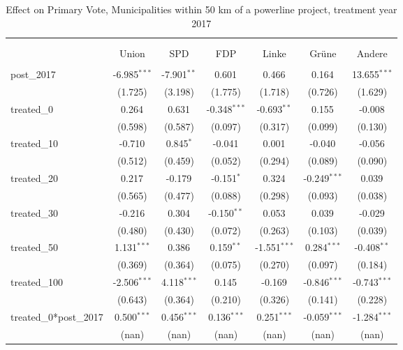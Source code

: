 \begin{table}[!htbp] \centering
  \caption{Effect on Primary Vote, Municipalities within 50 km of a powerline project, treatment year 2017}
\begin{tabular}{@{\extracolsep{5pt}}lcccccc}
\\[-1.8ex]\hline
\hline \\[-1.8ex]
\\[-1.8ex] & \multicolumn{1}{c}{Union} & \multicolumn{1}{c}{SPD} & \multicolumn{1}{c}{FDP} & \multicolumn{1}{c}{Linke} & \multicolumn{1}{c}{Grüne} & \multicolumn{1}{c}{Andere}  \\
\hline \\[-1.8ex]
 post_2017 & -6.985$^{***}$ & -7.901$^{**}$ & 0.601$^{}$ & 0.466$^{}$ & 0.164$^{}$ & 13.655$^{***}$ \\
  & (1.725) & (3.198) & (1.775) & (1.718) & (0.726) & (1.629) \\
 treated_0 & 0.264$^{}$ & 0.631$^{}$ & -0.348$^{***}$ & -0.693$^{**}$ & 0.155$^{}$ & -0.008$^{}$ \\
  & (0.598) & (0.587) & (0.097) & (0.317) & (0.099) & (0.130) \\
 treated_10 & -0.710$^{}$ & 0.845$^{*}$ & -0.041$^{}$ & 0.001$^{}$ & -0.040$^{}$ & -0.056$^{}$ \\
  & (0.512) & (0.459) & (0.052) & (0.294) & (0.089) & (0.090) \\
 treated_20 & 0.217$^{}$ & -0.179$^{}$ & -0.151$^{*}$ & 0.324$^{}$ & -0.249$^{***}$ & 0.039$^{}$ \\
  & (0.565) & (0.477) & (0.088) & (0.298) & (0.093) & (0.038) \\
 treated_30 & -0.216$^{}$ & 0.304$^{}$ & -0.150$^{**}$ & 0.053$^{}$ & 0.039$^{}$ & -0.029$^{}$ \\
  & (0.480) & (0.430) & (0.072) & (0.263) & (0.103) & (0.039) \\
 treated_50 & 1.131$^{***}$ & 0.386$^{}$ & 0.159$^{**}$ & -1.551$^{***}$ & 0.284$^{***}$ & -0.408$^{**}$ \\
  & (0.369) & (0.364) & (0.075) & (0.270) & (0.097) & (0.184) \\
 treated_100 & -2.506$^{***}$ & 4.118$^{***}$ & 0.145$^{}$ & -0.169$^{}$ & -0.846$^{***}$ & -0.743$^{***}$ \\
  & (0.643) & (0.364) & (0.210) & (0.326) & (0.141) & (0.228) \\
 treated_0*post_2017 & 0.500$^{***}$ & 0.456$^{***}$ & 0.136$^{***}$ & 0.251$^{***}$ & -0.059$^{***}$ & -1.284$^{***}$ \\
  & (nan) & (nan) & (nan) & (nan) & (nan) & (nan) \\

\end{tabular}
\end{table}

